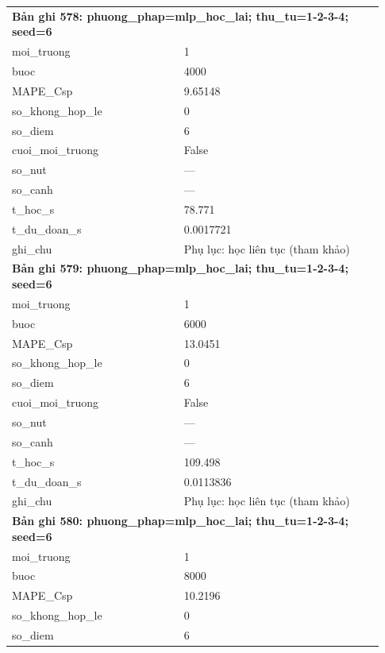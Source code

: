 \begin{longtable}{p{0.43\linewidth}p{0.50\linewidth}}
\midrule
\multicolumn{2}{p{0.95\linewidth}}{\textbf{Bản ghi 578: phuong\_phap=mlp\_hoc\_lai; thu\_tu=1-2-3-4; seed=6}} \\
moi\_\allowbreak truong & 1 \\
buoc & 4000 \\
MAPE\_\allowbreak Csp & 9.65148 \\
so\_\allowbreak khong\_\allowbreak hop\_\allowbreak le & 0 \\
so\_\allowbreak diem & 6 \\
cuoi\_\allowbreak moi\_\allowbreak truong & False \\
so\_\allowbreak nut & — \\
so\_\allowbreak canh & — \\
t\_\allowbreak hoc\_\allowbreak s & 78.771 \\
t\_\allowbreak du\_\allowbreak doan\_\allowbreak s & 0.0017721 \\
ghi\_\allowbreak chu & Phụ lục: học liên tục (tham khảo) \\
\midrule
\multicolumn{2}{p{0.95\linewidth}}{\textbf{Bản ghi 579: phuong\_phap=mlp\_hoc\_lai; thu\_tu=1-2-3-4; seed=6}} \\
moi\_\allowbreak truong & 1 \\
buoc & 6000 \\
MAPE\_\allowbreak Csp & 13.0451 \\
so\_\allowbreak khong\_\allowbreak hop\_\allowbreak le & 0 \\
so\_\allowbreak diem & 6 \\
cuoi\_\allowbreak moi\_\allowbreak truong & False \\
so\_\allowbreak nut & — \\
so\_\allowbreak canh & — \\
t\_\allowbreak hoc\_\allowbreak s & 109.498 \\
t\_\allowbreak du\_\allowbreak doan\_\allowbreak s & 0.0113836 \\
ghi\_\allowbreak chu & Phụ lục: học liên tục (tham khảo) \\
\midrule
\multicolumn{2}{p{0.95\linewidth}}{\textbf{Bản ghi 580: phuong\_phap=mlp\_hoc\_lai; thu\_tu=1-2-3-4; seed=6}} \\
moi\_\allowbreak truong & 1 \\
buoc & 8000 \\
MAPE\_\allowbreak Csp & 10.2196 \\
so\_\allowbreak khong\_\allowbreak hop\_\allowbreak le & 0 \\
so\_\allowbreak diem & 6 \\

\end{longtable}
